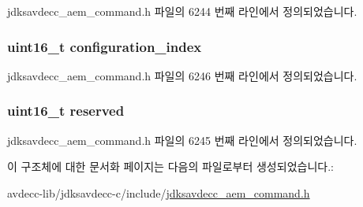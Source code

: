 jdksavdecc\+\_\+aem\+\_\+command.\+h 파일의 6244 번째 라인에서 정의되었습니다.

\subsubsection[{\texorpdfstring{configuration\+\_\+index}{configuration_index}}]{\setlength{\rightskip}{0pt plus 5cm}uint16\+\_\+t configuration\+\_\+index}\hypertarget{structjdksavdecc__aem__command__get__configuration__response_afaad1bd7c66f9611e134d8c5ce98f444}{}\label{structjdksavdecc__aem__command__get__configuration__response_afaad1bd7c66f9611e134d8c5ce98f444}


jdksavdecc\+\_\+aem\+\_\+command.\+h 파일의 6246 번째 라인에서 정의되었습니다.

\subsubsection[{\texorpdfstring{reserved}{reserved}}]{\setlength{\rightskip}{0pt plus 5cm}uint16\+\_\+t reserved}\hypertarget{structjdksavdecc__aem__command__get__configuration__response_a5a6ed8c04a3db86066924b1a1bf4dad3}{}\label{structjdksavdecc__aem__command__get__configuration__response_a5a6ed8c04a3db86066924b1a1bf4dad3}


jdksavdecc\+\_\+aem\+\_\+command.\+h 파일의 6245 번째 라인에서 정의되었습니다.



이 구조체에 대한 문서화 페이지는 다음의 파일로부터 생성되었습니다.\+:\begin{DoxyCompactItemize}
\item 
avdecc-\/lib/jdksavdecc-\/c/include/\hyperlink{jdksavdecc__aem__command_8h}{jdksavdecc\+\_\+aem\+\_\+command.\+h}\end{DoxyCompactItemize}
